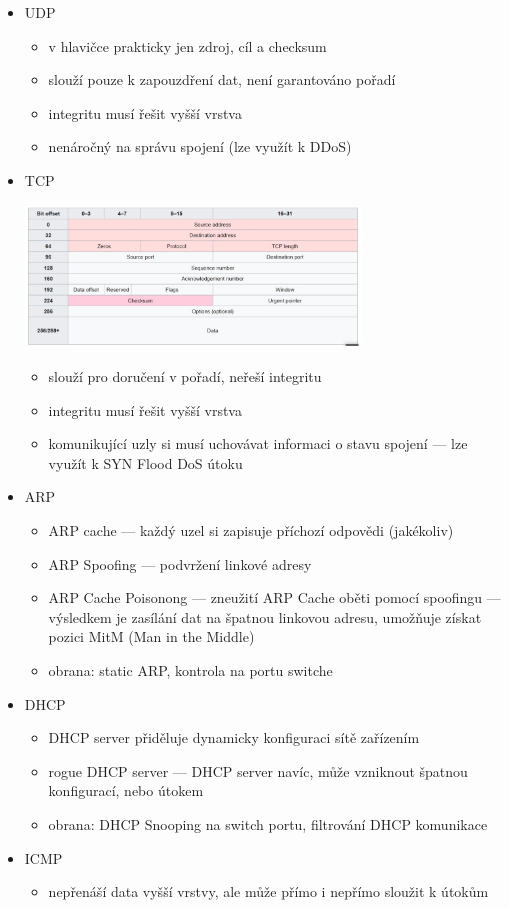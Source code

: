\begin{itemize}
	\item UDP
	\begin{itemize}
		\item v hlavičce prakticky jen zdroj, cíl a checksum
		\item slouží pouze k zapouzdření dat, není garantováno pořadí
		\item integritu musí řešit vyšší vrstva
		\item nenáročný na správu spojení (lze využít k DDoS)
	\end{itemize}
	
	\item TCP
	
	\includegraphics[width=0.7\textwidth]{img/OB-11_2.jpg}
	
	\begin{itemize}
		\item slouží pro doručení v pořadí, neřeší integritu
		\item integritu musí řešit vyšší vrstva
		\item komunikující uzly si musí uchovávat informaci o stavu spojení --- lze využít k SYN Flood DoS útoku
	\end{itemize}
	
	\item ARP
	\begin{itemize}
		\item ARP cache --- každý uzel si zapisuje příchozí odpovědi (jakékoliv)
		\item ARP Spoofing --- podvržení linkové adresy
		\item ARP Cache Poisonong --- zneužití ARP Cache oběti pomocí spoofingu --- výsledkem je zasílání dat na špatnou linkovou adresu, umožňuje získat pozici MitM (Man in the Middle)
		\item obrana: static ARP, kontrola na portu switche
	\end{itemize}
	
	\item DHCP
	\begin{itemize}
		\item DHCP server přiděluje dynamicky konfiguraci sítě zařízením
		\item rogue DHCP server --- DHCP server navíc, může vzniknout špatnou konfigurací, nebo útokem
		\item obrana: DHCP Snooping na switch portu, filtrování DHCP komunikace
	\end{itemize}
	
	\item ICMP
	\begin{itemize}
		\item nepřenáší data vyšší vrstvy, ale může přímo i nepřímo sloužit k útokům
	\end{itemize}
\end{itemize}

